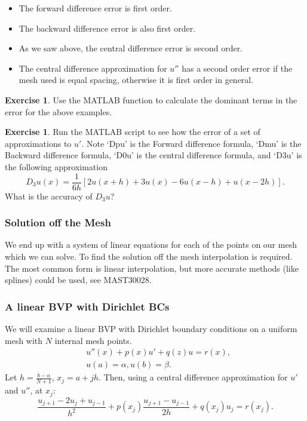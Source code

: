 \documentclass[12pt, a4paper]{article}
\theoremstyle{definition}
\newtheorem{exercise}[thm]{Exercise}
\theoremstyle{remark}
\numberwithin{equation}{section}
\begin{document}
\begin{itemize}
\item The forward difference error is first order.
\item The backward difference error is also first order.
\item As we saw above, the central difference error is second order.
\item The central difference approximation for $u''$ has a second order error if the mesh used is equal spacing, otherwise it is first order in general.
\end{itemize}


\newpage
\begin{exercise}
Use the MATLAB function  to calculate the dominant terms in the  error for the above examples.  
\end{exercise}

\begin{exercise}
Run the MATLAB script  to see how the error of a set of approximations to $u'$. Note `Dpu' is the Forward difference formula, `Dmu' is the Backward difference formula, `D0u' is the central difference formula, and  `D3u' is the following approximation
\begin{equation}
D_{3}u(x) = \frac{1}{6h}[2u(x+h) + 3u(x) - 6u(x-h) +u(x-2h)]. \nonumber
\end{equation}  
What is the accuracy of $D_3u$?
\end{exercise}

\subsubsection{Solution off the Mesh}
We end up with a system of linear equations for each of the points on our mesh which we can solve. 
To find the solution off the mesh interpolation is required. The most common form is linear interpolation, but more accurate methods (like splines) could be used, see MAST30028.

\newpage

\subsubsection{A linear BVP with Dirichlet BCs}
We will examine a linear BVP with Dirichlet boundary conditions on a uniform mesh with $N$ internal mesh points.
\begin{align*}
&u''(x)+p(x)u'+q(z)u=r(x),\\
&u(a)=\alpha, u(b)=\beta.
\end{align*}
Let $h=\frac{b-a}{N+1}$, $x_j=a+jh$.
Then, using a central difference approximation for $u'$ and $u''$, at $x_j$:
\begin{equation*}
\frac{u_{j+1}-2u_j+u_{j-1}}{h^2}+p(x_j)\frac{u_{j+1}-u_{j-1}}{2h}+q(x_j)u_j=r(x_j).
\end{equation*}
\end{document}

